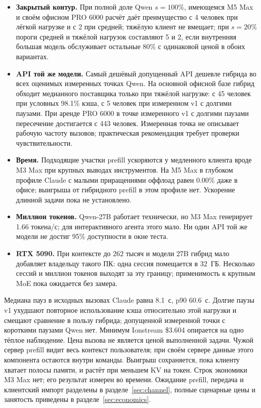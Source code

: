 \begin{itemize}
\item \textbf{Закрытый контур.} При полной доле Qwen $s=100\%$, имеющемся M5 Max и своём офисном PRO 6000 расчёт даёт преимущество с 4 человек при лёгкой нагрузке и с 2 при средней; тяжёлую клиент не вмещает; при $s=20\%$ пороги средней и тяжёлой нагрузок составляют 5 и 2, если внутренняя большая модель обслуживает остальные 80\% с одинаковой ценой в обоих вариантах.
\item \textbf{API той же модели.} Самый дешёвый допущенный API дешевле гибрида во всех оценимых измеренных точках Qwen.
На основной офисной базе гибрид обходит медианного поставщика только при тяжёлой нагрузке:
с 45 человек при условных 98.1\% кэша, с 5 человек при измеренном v1 с долгими паузами.
При аренде PRO 6000 в точке измеренного v1 с долгими паузами пересечение достигается с 443 человек.
Измеренная точка не описывает рабочую частоту вызовов; практическая рекомендация требует проверки чувствительности.
\item \textbf{Время.} Подходящие участки prefill ускоряются у медленного клиента вроде M3 Max при крупных выводах инструментов.
На M5 Max в глубоком профиле Claude с малыми приращениями оффлоад равен 0.00\% даже в офисе;
выигрыша от гибридного prefill в этом профиле нет. Ускорение длинной задачи пока не установлено.
\item \textbf{Миллион токенов.} Qwen-27B работает технически, но M3 Max генерирует 1.66 токена/с;
для интерактивного агента этого мало. Ни один API той же модели не достиг 95\% доступности в окне теста.
\item \textbf{RTX 5090.} При контексте до 262 тысяч и модели 27B гибрид мало добавляет владельцу такого ПК:
одна сессия помещается в 32~ГБ. Несколько сессий и миллион токенов выходят за эту границу;
применимость к крупным MoE пока ожидается без замера.
\end{itemize}

Медиана пауз в исходных вызовах Claude равна 8.1~с, p90 60.6~с.
Долгие паузы v1 ухудшают повторное использование кэша относительно этой нагрузки и смещают сравнение в пользу гибрида;
допущенной измеренной точки с короткими паузами Qwen нет. Минимум Ionstream \$3.604 опирается на одно тёплое наблюдение.
Цена вызова не является ценой выполненной задачи. Чужой сервер prefill видит весь контекст пользователя;
при своём сервере данные этого компонента остаются внутри команды.
Выигрыш сохраняется, пока клиенту хватает полосы памяти, и растёт при меньшем KV на токен.
Строк экономики M3 Max нет; его результат измерен во времени.
Ожидание prefill, передача и клиентский импорт разделены в разделе~\ref{sec:channel},
полные сценарные цены и занятость приведены в разделе~\ref{sec:economics}.

